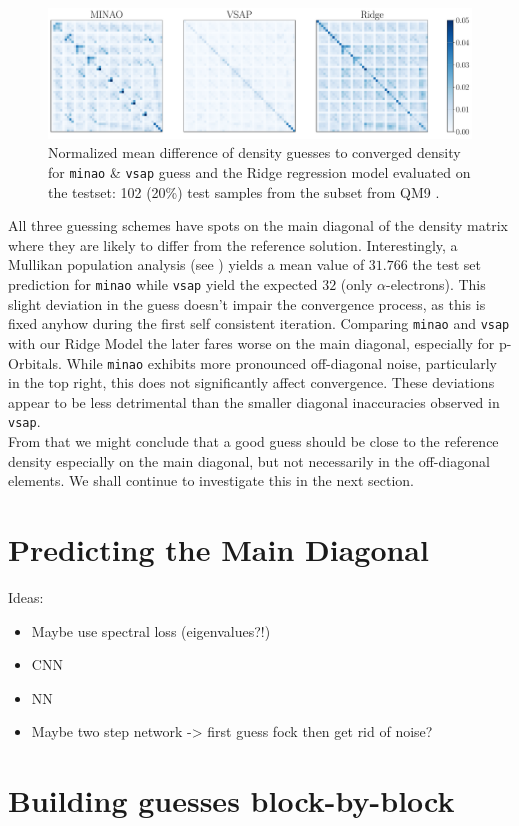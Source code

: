 \begin{figure}[H]
    \centering
    \includegraphics[width=\textwidth]{../fig/c5h4n2o2/density_error_comparison.pdf}
    \caption[Normalized difference of density guesses]{Normalized mean difference of density guesses to converged density for \texttt{minao} \& \texttt{vsap} guess and the Ridge regression model evaluated on the testset: 102 (20\%) test samples from the  subset from QM9 \parencite{ref:article1_qm9}.}
    \label{fig:density_error_comparison}
\end{figure}
All three guessing schemes have spots on the main diagonal of the density matrix where they are likely to differ from the reference solution. Interestingly, a Mullikan population analysis (see ) \parencite{ref:Mulliken_population_analysis} yields a mean value of $31.766$ the test set prediction for \texttt{minao} while \texttt{vsap} yield the expected $32$ (only $\alpha$-electrons). This slight deviation in the guess doesn't impair the convergence process, as this is fixed anyhow during the first self consistent iteration. Comparing \texttt{minao} and \texttt{vsap} with our Ridge Model the later fares worse on the main diagonal, especially for p-Orbitals. While \texttt{minao} exhibits more pronounced off-diagonal noise, particularly in the top right, this does not significantly affect convergence. These deviations appear to be less detrimental than the smaller diagonal inaccuracies observed in \texttt{vsap}. \\
From that we might conclude that a good guess should be close to the reference density especially on the main diagonal, but not necessarily in the off-diagonal elements. We shall continue to investigate this in the next section.

\section{Predicting the Main Diagonal}
\label{sec:main_diagonal}

Ideas: 
\begin{itemize}
    \item Maybe use spectral loss (eigenvalues?!)
    \item CNN
    \item NN 
    \item Maybe two step network -> first guess fock then get rid of noise?
\end{itemize}


\section{Building guesses block-by-block}
\label{sec:blockwise_guessing}
